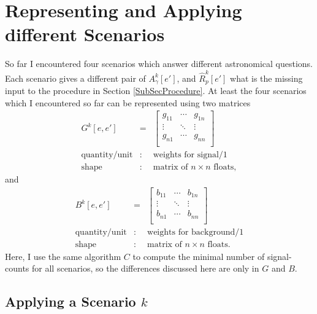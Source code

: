 \documentclass{article}%
\begin{document}
    \section{Representing and Applying different Scenarios}
        So far I encountered four scenarios which answer different astronomical questions.
        Each scenario gives a different pair of $A^k_\gamma[e']$, and $\hat{R}^k_p[e']$ what is the missing input to the procedure in Section \ref{SubSecProcedure}.
        At least the four scenarios which I encountered so far can be represented using two matrices
        \begin{eqnarray*}
            G^k[e, e'] &=&
              \left[ {\begin{array}{ccc}
                g_{11} & \cdots & g_{1n}\\
                \vdots & \ddots & \vdots\\
                g_{n1} & \cdots & g_{nn}\\
              \end{array} } \right]\\
            \text{quantity}/\text{unit} &:& \text{weights for signal}/1\\
            \text{shape} &:& \text{matrix of}\,\,n \times n \,\,\text{floats},
        \end{eqnarray*}
        and
        \begin{eqnarray*}
            B^k[e, e'] &=&
              \left[ {\begin{array}{cccc}
                b_{11} & \cdots & b_{1n}\\
                \vdots & \ddots & \vdots\\
                b_{n1} & \cdots & b_{nn}\\
              \end{array} } \right]\\
            \text{quantity}/\text{unit} &:& \text{weights for background}/1\\
            \text{shape} &:& \text{matrix of}\,\,n \times n \,\,\text{floats}.
        \end{eqnarray*}
        Here, I use the same algorithm $C$ to compute the minimal number of signal-counts for all scenarios, so the differences discussed here are only in $G$ and $B$.
        \subsection{Applying a Scenario $k$}
\end{document}
